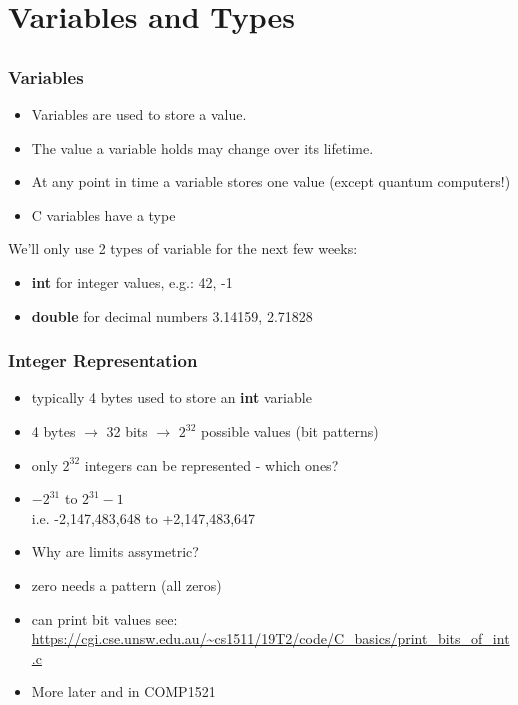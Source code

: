 


\section{Variables and Types}
\subsection{}

\begin{frame}
\frametitle{Variables}

\begin{itemize}
\item Variables are used to store a value.
\item The value a variable holds may change over its lifetime.
\item At any point in time a variable stores one value {\small (except quantum computers!)}
\item C variables have a type
\end{itemize}

We'll only use 2 types of variable for the next few weeks:

\begin{itemize}
\item {\bf int} for integer values, e.g.: 42, -1
\item  {\bf double} for decimal numbers  3.14159, 2.71828
\end{itemize}
\end{frame}


\begin{frame}
\frametitle{Integer Representation}
\begin{itemize}
\item typically 4 bytes used to store an {\bf int}  variable
\item 4 bytes $\rightarrow$ 32 bits $\rightarrow$ $2^{32}$ possible values (bit patterns)
\item only $2^{32}$ integers can be represented - which ones?
\item $-2^{31}$ to $2^{31}-1$\\i.e. -2,147,483,648 to +2,147,483,647
\item Why are limits assymetric? \\
\item zero needs a pattern (all zeros)
\item can print bit values see: \\
{\small \url{https://cgi.cse.unsw.edu.au/~cs1511/19T2/code/C_basics/print_bits_of_int.c}}
\item More later and in COMP1521
\end{itemize}
\end{frame}

